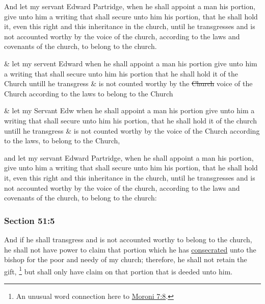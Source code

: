 		And let my servant Edward Partridge, when he shall appoint a man his portion, give unto him a writing that shall secure unto him his portion, that he shall hold it, even this right and this inheritance in the church, until he transgresses and is not accounted worthy by the voice of the church, according to the laws and covenants of the church, to belong to the church.

		\begin{framed}
		\scriptsize
			\begin{compactdesc}
				\item[JSP] \& let my servent Edward when he shall appoint a man his portion give unto him a writing that shall secure unto him his portion that he shall hold it of the Church untill he transgress \& is not counted worthy by the \sout{Church} voice of the Church according to the laws to belong to the Church
				\item[Gilbert] \& let my Servant Edw when he shall appoint a man his portion give unto him a writing that shall secure unto him his portion, that he shall hold it of the church untill he transgress \& is not counted worthy by the voice of the Church according to the laws, to belong to the Church,
				\item[DC 1835] and let my servant Edward Partridge, when he shall appoint a man his portion, give unto him a writing that shall secure unto him his portion, that he shall hold it, even this right and this inheritance in the church, until he transgresses and is not accounted worthy by the voice of the church, according to the laws and covenants of the church, to belong to the church:
			\end{compactdesc}
		\end{framed}

	\subsubsection{Section 51:5} %
		\label{DC51-5}

		And if he shall transgress and is not accounted worthy to belong to the church, he shall not have power to claim that portion which he has \hyperref[CONSECRATION]{consecrated} unto the bishop for the poor and needy of my church; therefore, he shall not retain the gift,%
			\footnote{%
				An unusual word connection here to \hyperref[MORONI-7-8]{Moroni 7:8}.
				}
		but shall only have claim on that portion that is deeded unto him.

